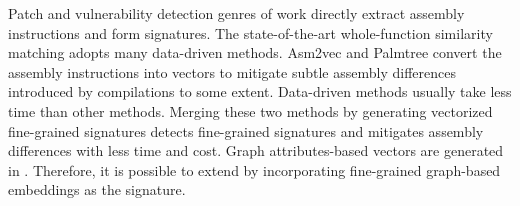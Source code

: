 Patch and vulnerability detection genres of work directly extract assembly instructions and form signatures. 
The state-of-the-art whole-function similarity matching adopts many data-driven methods. 
Asm2vec \cite{asm2vec} and Palmtree \cite{Palmtree} convert the assembly instructions into vectors to mitigate subtle assembly differences introduced by compilations to some extent. 
Data-driven methods usually take less time than other methods. 
Merging these two methods by generating vectorized fine-grained signatures detects fine-grained signatures and mitigates assembly differences with less time and cost. 
Graph attributes-based vectors are generated in \cite{gemini,VULSEEKER}. 
Therefore, it is possible to extend \name by incorporating fine-grained graph-based embeddings as the signature.

